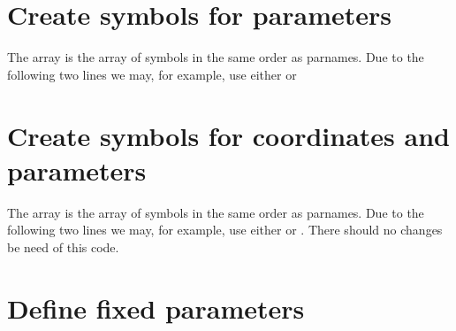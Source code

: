 \documentclass[letterpaper,10pt,english]{jupyterBook}
\begin{document}
\section{Create symbols for parameters}
\label{\detokenize{HodgkinHuxleyGenSym:create-symbols-for-parameters}}
\sphinxAtStartPar
The array  is the array of symbols in the same order as parnames.
Due to the following two lines we may, for example, use either  or


\section{Create symbols for coordinates and parameters}
\label{\detokenize{HodgkinHuxleyGenSym:create-symbols-for-coordinates-and-parameters}}
\sphinxAtStartPar
The array  is the array of symbols in the same order as parnames.
Due to the following two lines we may, for example, use either  or
. There should no changes be need of this code.

\begin{sphinxVerbatim}[commandchars=\\\{\}]
\end{sphinxVerbatim}


\section{Define fixed parameters}
\label{\detokenize{HodgkinHuxleyGenSym:define-fixed-parameters}}
\begin{sphinxVerbatim}[commandchars=\\\{\}]
\end{sphinxVerbatim}
\end{document}
